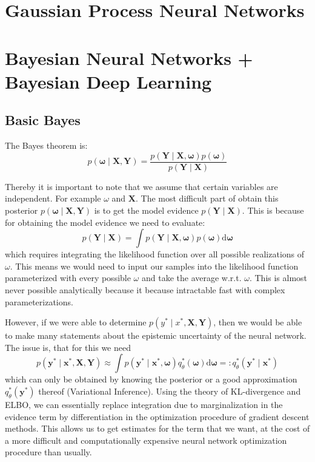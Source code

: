 \documentclass{article}
\begin{document}
\section{Gaussian Process Neural Networks}


\section{Bayesian Neural Networks + Bayesian Deep Learning}
\subsection{Basic Bayes}

The Bayes theorem is:
$$p(\boldsymbol{\omega} \mid \mathbf{X}, \mathbf{Y})=\frac{p(\mathbf{Y} \mid \mathbf{X}, \boldsymbol{\omega}) p(\boldsymbol{\omega})}{p(\mathbf{Y} \mid \mathbf{X}) }$$

Thereby it is important to note that we assume that certain variables are independent. For example $\omega$ and $\mathbf{X}$. The most difficult part of obtain this posterior $p(\boldsymbol{\omega} \mid \mathbf{X}, \mathbf{Y})$ is to get the model evidence $p(\mathbf{Y} \mid \mathbf{X})$. This is because for obtaining the model evidence we need to evaluate:
$$p(\mathbf{Y} \mid \mathbf{X})=\int p(\mathbf{Y} \mid \mathbf{X}, \boldsymbol{\omega}) p(\boldsymbol{\omega}) \mathrm{d} \boldsymbol{\omega}$$
which requires integrating the likelihood function over all possible realizations of $\omega$. This means we would need to input our samples into the likelihood function parameterized with every possible $\omega$ and take the average w.r.t. $\omega$. This is almost never possible analytically because it because intractable fast with complex parameterizations.

However, if we were able to determine $p(y^* \mid x^*, \mathbf{X}, \mathbf{Y})$, then we would be able to make many statements about the epistemic uncertainty of the neural network. The issue is, that for this we need
$$ p\left(\mathbf{y}^* \mid \mathbf{x}^*, \mathbf{X}, \mathbf{Y}\right) \approx \int p\left(\mathbf{y}^* \mid \mathbf{x}^*, \boldsymbol{\omega}\right) q_\theta^*(\boldsymbol{\omega}) \mathrm{d} \boldsymbol{\omega}=: q_\theta^*\left(\mathbf{y}^* \mid \mathbf{x}^*\right)$$
which can only be obtained by knowing the posterior or a good approximation $q_\theta^*\left(\mathbf{y}^*\right)$ thereof (Variational Inference). Using the theory of KL-divergence and ELBO, we can essentially replace integration due to marginalization in the evidence term by differentiation in the optimization procedure of gradient descent methods. This allows us to get estimates for the term that we want, at the cost of a more difficult and computationally expensive neural network optimization procedure than usually.
\end{document}
